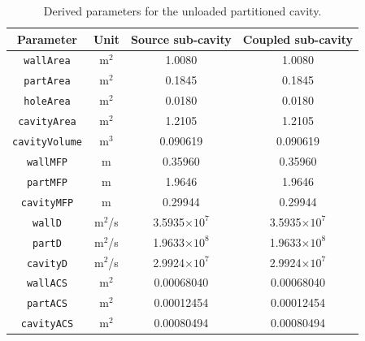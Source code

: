 \documentclass[a4paper]{article}
\numberwithin{equation}{section}
\begin{document}
\begin{table}[ht]
\begin{center}
\begin{tabular}{|c|c|c|c|}
\hline
\textbf{Parameter}     &\textbf{Unit} &\textbf{Source sub-cavity} &\textbf{Coupled sub-cavity}\\ 
\hline
\texttt{wallArea}      &m$^2$         &1.0080                     &1.0080              \\
\texttt{partArea}      &m$^2$         &0.1845                     &0.1845              \\
\texttt{holeArea}      &m$^2$         &0.0180                     &0.0180              \\
\texttt{cavityArea}    &m$^2$         &1.2105                     &1.2105              \\
\texttt{cavityVolume}  &m$^3$         &0.090619                   &0.090619            \\
\texttt{wallMFP}       &m             &0.35960                    &0.35960             \\
\texttt{partMFP}       &m             &1.9646                     &1.9646              \\
\texttt{cavityMFP}     &m             &0.29944                    &0.29944             \\
\texttt{wallD}         &m$^2$/s       &3.5935$\times 10^7$        &3.5935$\times 10^7$ \\
\texttt{partD}         &m$^2$/s       &1.9633$\times 10^8$        &1.9633$\times 10^8$ \\
\texttt{cavityD}       &m$^2$/s       &2.9924$\times 10^7$        &2.9924$\times 10^7$ \\
\texttt{wallACS}       &m$^2$         &0.00068040                 &0.00068040          \\
\texttt{partACS}       &m$^2$         &0.00012454                 &0.00012454          \\
\texttt{cavityACS}     &m$^2$         &0.00080494                 &0.00080494          \\
\hline
\end{tabular}
\end{center}
\caption{\label{tb:derivparamdu} Derived parameters for the unloaded partitioned cavity.}
\end{table}
\end{document}
